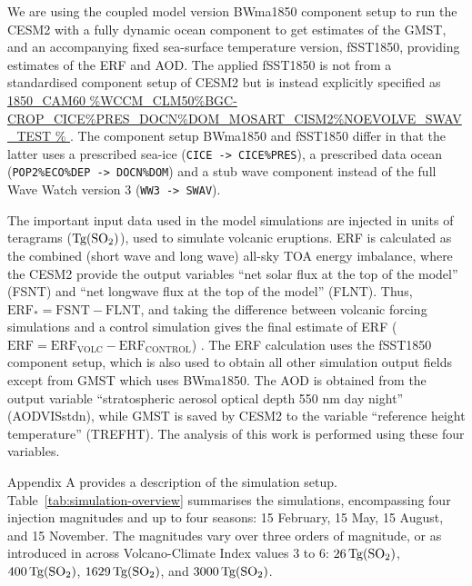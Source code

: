 \documentclass[draft]{agujournal2019}
\begin{document}
  We are using the coupled model version BWma1850 component setup to run the CESM2 with
  a fully dynamic ocean component to get estimates of the GMST, and an accompanying
  fixed sea-surface temperature version, fSST1850, providing estimates of the ERF and
  AOD. The applied fSST1850 is not from a standardised component setup of CESM2 but is
  instead explicitly specified as \url{1850_CAM60
  }. %
  The component setup BWma1850 and fSST1850 differ in that the latter uses a prescribed
  sea-ice (\texttt{CICE -> CICE\%PRES}), a prescribed data ocean (\texttt{POP2\%ECO\%DEP
    -> DOCN\%DOM}) and a stub wave component instead of the full Wave Watch version 3
  (\texttt{WW3 -> SWAV}).

  The important input data used in the model simulations are injected  in units
  of teragrams (\(\si{\tera\gram(\ce{SO2})}\)), used to simulate volcanic eruptions. ERF
  is calculated as the combined (short wave and long wave) all-sky TOA energy imbalance,
  where the CESM2 provide the output variables ``net solar flux at the top of the
  model'' (FSNT) and ``net longwave flux at the top of the model'' (FLNT). Thus,
  \(\mathrm{ERF_*}= \mathrm{FSNT} - \mathrm{FLNT}\), and taking the difference between
  volcanic forcing simulations and a control simulation gives the final estimate of ERF
  (\(\mathrm{ERF}=\mathrm{ERF_{VOLC}}-\mathrm{ERF_{CONTROL}}\)) \cite{marshall2020}. The
  ERF calculation uses the fSST1850 component setup, which is also used to obtain all
  other simulation output fields except from GMST which uses BWma1850. The AOD is
  obtained from the output variable ``stratospheric aerosol optical depth 550 nm day
  night'' (AODVISstdn), while GMST is saved by CESM2 to the variable ``reference height
  temperature'' (TREFHT). The analysis of this work is performed using these four
  variables.

  Appendix A provides a description of the simulation setup.
  Table~\ref{tab:simulation-overview} summarises the simulations, encompassing four
   injection magnitudes and up to four seasons: 15 February, 15 May, 15 August,
  and 15 November. The magnitudes vary over three orders of magnitude, or as introduced
  in  across Volcano-Climate Index values \(3\) to \(6\):
  \(\SI{26}{\tera\gram(\ce{SO2})}\), \(\SI{400}{\tera\gram(\ce{SO2})}\),
  \(\SI{1629}{\tera\gram(\ce{SO2})}\), and \(\SI{3000}{\tera\gram(\ce{SO2})}\).
\end{document}
